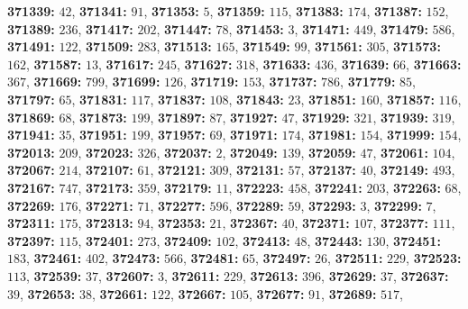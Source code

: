 \textsf{\bfseries 371339:} $42$, \textsf{\bfseries 371341:} $91$, \textsf{\bfseries 371353:} $5$, \textsf{\bfseries 371359:} $115$, \textsf{\bfseries 371383:} $174$, \textsf{\bfseries 371387:} $152$, \textsf{\bfseries 371389:} $236$, \textsf{\bfseries 371417:} $202$, \textsf{\bfseries 371447:} $78$, \textsf{\bfseries 371453:} $3$, \textsf{\bfseries 371471:} $449$, \textsf{\bfseries 371479:} $586$, \textsf{\bfseries 371491:} $122$, \textsf{\bfseries 371509:} $283$, \textsf{\bfseries 371513:} $165$, \textsf{\bfseries 371549:} $99$, \textsf{\bfseries 371561:} $305$, \textsf{\bfseries 371573:} $162$, \textsf{\bfseries 371587:} $13$, \textsf{\bfseries 371617:} $245$, \textsf{\bfseries 371627:} $318$, \textsf{\bfseries 371633:} $436$, \textsf{\bfseries 371639:} $66$, \textsf{\bfseries 371663:} $367$, \textsf{\bfseries 371669:} $799$, \textsf{\bfseries 371699:} $126$, \textsf{\bfseries 371719:} $153$, \textsf{\bfseries 371737:} $786$, \textsf{\bfseries 371779:} $85$, \textsf{\bfseries 371797:} $65$, \textsf{\bfseries 371831:} $117$, \textsf{\bfseries 371837:} $108$, \textsf{\bfseries 371843:} $23$, \textsf{\bfseries 371851:} $160$, \textsf{\bfseries 371857:} $116$, \textsf{\bfseries 371869:} $68$, \textsf{\bfseries 371873:} $199$, \textsf{\bfseries 371897:} $87$, \textsf{\bfseries 371927:} $47$, \textsf{\bfseries 371929:} $321$, \textsf{\bfseries 371939:} $319$, \textsf{\bfseries 371941:} $35$, \textsf{\bfseries 371951:} $199$, \textsf{\bfseries 371957:} $69$, \textsf{\bfseries 371971:} $174$, \textsf{\bfseries 371981:} $154$, \textsf{\bfseries 371999:} $154$, \textsf{\bfseries 372013:} $209$, \textsf{\bfseries 372023:} $326$, \textsf{\bfseries 372037:} $2$, \textsf{\bfseries 372049:} $139$, \textsf{\bfseries 372059:} $47$, \textsf{\bfseries 372061:} $104$, \textsf{\bfseries 372067:} $214$, \textsf{\bfseries 372107:} $61$, \textsf{\bfseries 372121:} $309$, \textsf{\bfseries 372131:} $57$, \textsf{\bfseries 372137:} $40$, \textsf{\bfseries 372149:} $493$, \textsf{\bfseries 372167:} $747$, \textsf{\bfseries 372173:} $359$, \textsf{\bfseries 372179:} $11$, \textsf{\bfseries 372223:} $458$, \textsf{\bfseries 372241:} $203$, \textsf{\bfseries 372263:} $68$, \textsf{\bfseries 372269:} $176$, \textsf{\bfseries 372271:} $71$, \textsf{\bfseries 372277:} $596$, \textsf{\bfseries 372289:} $59$, \textsf{\bfseries 372293:} $3$, \textsf{\bfseries 372299:} $7$, \textsf{\bfseries 372311:} $175$, \textsf{\bfseries 372313:} $94$, \textsf{\bfseries 372353:} $21$, \textsf{\bfseries 372367:} $40$, \textsf{\bfseries 372371:} $107$, \textsf{\bfseries 372377:} $111$, \textsf{\bfseries 372397:} $115$, \textsf{\bfseries 372401:} $273$, \textsf{\bfseries 372409:} $102$, \textsf{\bfseries 372413:} $48$, \textsf{\bfseries 372443:} $130$, \textsf{\bfseries 372451:} $183$, \textsf{\bfseries 372461:} $402$, \textsf{\bfseries 372473:} $566$, \textsf{\bfseries 372481:} $65$, \textsf{\bfseries 372497:} $26$, \textsf{\bfseries 372511:} $229$, \textsf{\bfseries 372523:} $113$, \textsf{\bfseries 372539:} $37$, \textsf{\bfseries 372607:} $3$, \textsf{\bfseries 372611:} $229$, \textsf{\bfseries 372613:} $396$, \textsf{\bfseries 372629:} $37$, \textsf{\bfseries 372637:} $39$, \textsf{\bfseries 372653:} $38$, \textsf{\bfseries 372661:} $122$, \textsf{\bfseries 372667:} $105$, \textsf{\bfseries 372677:} $91$, \textsf{\bfseries 372689:} $517$, 

